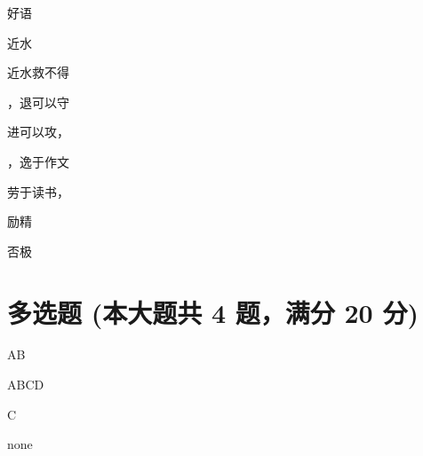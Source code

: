 \documentclass[12pt, a4paper, addpoints, answers]{exam}
\begin{document}
\begin{multicols}{2}
\begin{questions}
\question[2] 

\question[2] 好语\fillin

\question[2] 

\question[2] 近水

\question[2] 近水救不得\fillin

\question[2] \fillin，退可以守

\question[2] 进可以攻，\fillin

\question[2] \fillin，逸于作文

\question[2] 劳于读书，\fillin

\question[2] 

\question[2] 励精\fillin

\question[2] 

\question[2] 否极\fillin

\end{questions}
\end{multicols}

\hspace{5cm}

\section{\normalsize{多选题 (本大题共 4 题，满分 20 分)}}
\hspace{1.5cm}

\begin{questions}
\question[5] AB

\begin{oneparcheckboxes}
\end{oneparcheckboxes}

\question[5] ABCD

\begin{oneparcheckboxes}
\end{oneparcheckboxes}

\question[5] C

\begin{oneparcheckboxes}
\end{oneparcheckboxes}

\question[5] none

\begin{oneparcheckboxes}
\end{oneparcheckboxes}

\end{questions}
\end{document}
